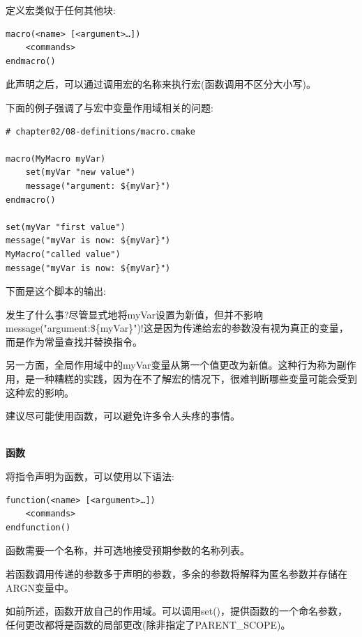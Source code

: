 定义宏类似于任何其他块:

\begin{lstlisting}[style=styleCMake]
macro(<name> [<argument>…])
	<commands>
endmacro()
\end{lstlisting}

此声明之后，可以通过调用宏的名称来执行宏(函数调用不区分大小写)。

下面的例子强调了与宏中变量作用域相关的问题:

\begin{lstlisting}[style=styleCMake]
# chapter02/08-definitions/macro.cmake

macro(MyMacro myVar)
	set(myVar "new value")
	message("argument: ${myVar}")
endmacro()

set(myVar "first value")
message("myVar is now: ${myVar}")
MyMacro("called value")
message("myVar is now: ${myVar}")
\end{lstlisting}

下面是这个脚本的输出:


发生了什么事?尽管显式地将myVar设置为新值，但并不影响message("argument:\$\{myVar\}")!这是因为传递给宏的参数没有视为真正的变量，而是作为常量查找并替换指令。

另一方面，全局作用域中的myVar变量从第一个值更改为新值。这种行为称为副作用，是一种糟糕的实践，因为在不了解宏的情况下，很难判断哪些变量可能会受到这种宏的影响。

建议尽可能使用函数，可以避免许多令人头疼的事情。

\hspace*{\fill} \\ %
\noindent
\textbf{函数}

将指令声明为函数，可以使用以下语法:

\begin{lstlisting}[style=styleCMake]
function(<name> [<argument>…])
	<commands>
endfunction()
\end{lstlisting}

函数需要一个名称，并可选地接受预期参数的名称列表。

若函数调用传递的参数多于声明的参数，多余的参数将解释为匿名参数并存储在ARGN变量中。

如前所述，函数开放自己的作用域。可以调用set()，提供函数的一个命名参数，任何更改都将是函数的局部更改(除非指定了PARENT\_SCOPE)。

